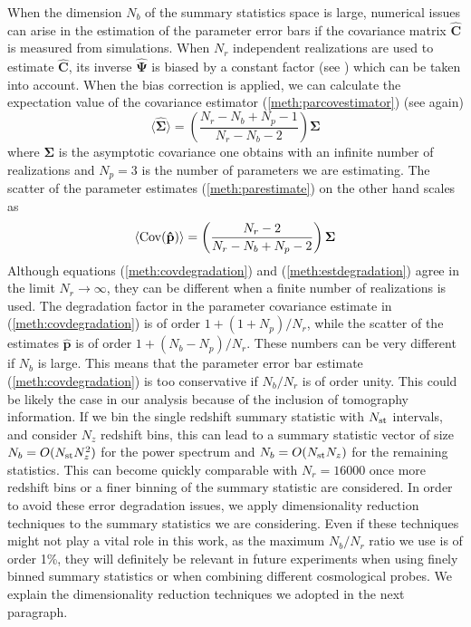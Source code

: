 \documentclass[reprint,aps,prd,superscriptaddress,showkeys,showpacs]{revtex4-1}
\newcommand{\bb}[1]{\mathbf{#1}}
\newcommand{\bbh}[1]{\mathbf{\hat{#1}}}
\begin{document}
When the dimension $N_b$ of the summary statistics space is large, numerical issues can arise in the estimation of the parameter error bars if the covariance matrix $\bbh{C}$ is measured from simulations. When $N_r$ independent realizations are used to estimate $\bbh{C}$, its inverse $\bbh{\Psi}$ is biased by a constant factor (see \citep{Hartlap07,Taylor12,Taylor14}) which can be taken into account. When the bias correction is applied, we can calculate the expectation value of the covariance estimator (\ref{meth:parcovestimator}) (see again\citep{Taylor14})
\begin{equation}
\label{meth:covdegradation}
\langle\bbh{\Sigma}\rangle = \left(\frac{N_r-N_b+N_p-1}{N_r-N_b-2}\right)\bb{\Sigma}
\end{equation}   
%
where $\bb{\Sigma}$ is the asymptotic covariance one obtains with an infinite number of realizations and $N_p=3$ is the number of parameters we are estimating. The scatter of the parameter estimates (\ref{meth:parestimate}) on the other hand scales as \citep{Taylor14}
\begin{equation}
\label{meth:estdegradation}
\langle{\rm Cov}(\bbh{p})\rangle = \left(\frac{N_r-2}{N_r-N_b+N_p-2}\right)\bb{\Sigma}
\end{equation}
%
Although equations (\ref{meth:covdegradation}) and (\ref{meth:estdegradation}) agree in the limit $N_r\rightarrow\infty$, they can be different when a finite number of realizations is used. The degradation factor in the parameter covariance estimate in (\ref{meth:covdegradation}) is of order $1+(1+N_p)/N_r$, while the scatter of the estimates $\bbh{p}$ is of order $1+(N_b-N_p)/N_r$. These numbers can be very different if $N_b$ is large. This means that the parameter error bar estimate (\ref{meth:covdegradation}) is too conservative if $N_b/N_r$ is of order unity. This could be likely the case in our analysis because of the inclusion of tomography information. If we bin the single redshift summary statistic with $N_{\rm st}$ intervals, and consider $N_z$ redshift bins, this can lead to a summary statistic vector of size $N_b = O(N_{\rm st}N_z^2)$ for the power spectrum and $N_b = O(N_{\rm st}N_z)$ for the remaining statistics. This can become quickly comparable with $N_r=16000$ once more redshift bins or a finer binning of the summary statistic are considered. In order to avoid these error degradation issues, we apply dimensionality reduction techniques to the summary statistics we are considering. Even if these techniques might not play a vital role in this work, as the maximum $N_b/N_r$ ratio we use is of order 1\%, they will definitely be relevant in future experiments when using finely binned summary statistics or when combining different cosmological probes. We explain the dimensionality reduction techniques we adopted in the next paragraph.   
\end{document}
